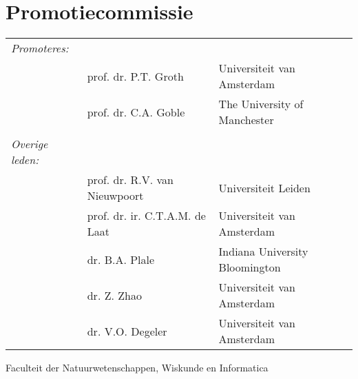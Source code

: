 \newpage

\section*{Promotiecommissie}

\begin{tabular}{lll}

\textit{Promoteres:}  &  & \\
     & prof. dr. P.T. Groth     & Universiteit van Amsterdam \\
     &  prof. dr. C.A. Goble & The University of Manchester \\
	& & \\     

\textit{Overige leden:} & & \\
     &  prof. dr. R.V. van Nieuwpoort   & Universiteit Leiden \\
     &  prof. dr. ir. C.T.A.M. de Laat  & Universiteit van Amsterdam \\
     &  dr. B.A. Plale     & Indiana University Bloomington  \\     
     &  dr. Z. Zhao         & Universiteit van Amsterdam  \\     
     &  dr. V.O. Degeler     & Universiteit van Amsterdam \\
\end{tabular}

Faculteit der Natuurwetenschappen, Wiskunde en Informatica
